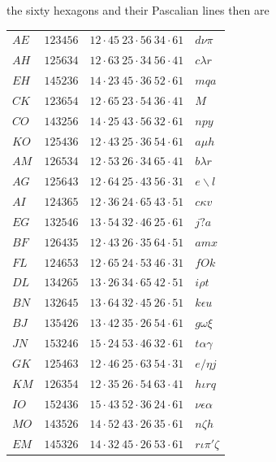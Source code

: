 \documentclass[11pt,a4paper]{article}
\theoremstyle{definition}
\begin{document}
\newpage

the sixty hexagons and their Pascalian lines then are
\begin{center}
\small
\begin{tabular}{llll}
$AE$ & $123456$ & $12 \cdot 45\ 23 \cdot 56\ 34 \cdot 61$ & $d\nu\pi$\\
$AH$ & $125634$ & $12 \cdot 63\ 25 \cdot 34\ 56 \cdot 41$ & $c\lambda r$\\
$EH$ & $145236$ & $14 \cdot 23\ 45 \cdot 36\ 52 \cdot 61$ & $mqa$\\
$CK$ & $123654$ & $12 \cdot 65\ 23 \cdot 54\ 36 \cdot 41$ & $M$\\
$CO$ & $143256$ & $14 \cdot 25\ 43 \cdot 56\ 32 \cdot 61$ & $npy$\\
$KO$ & $125436$ & $12 \cdot 43\ 25 \cdot 36\ 54 \cdot 61$ & $a\mu h$\\
$AM$ & $126534$ & $12 \cdot 53\ 26 \cdot 34\ 65 \cdot 41$ & $b\lambda r$\\
$AG$ & $125643$ & $12 \cdot 64\ 25 \cdot 43\ 56 \cdot 31$ & $e\backslash l$\\
$AI$ & $124365$ & $12 \cdot 36\ 24 \cdot 65\ 43 \cdot 51$ & $c\kappa v$\\
$EG$ & $132546$ & $13 \cdot 54\ 32 \cdot 46\ 25 \cdot 61$ & $j?a$\\
$BF$ & $126435$ & $12 \cdot 43\ 26 \cdot 35\ 64 \cdot 51$ & $amx$\\
$FL$ & $124653$ & $12 \cdot 65\ 24 \cdot 53\ 46 \cdot 31$ & $fOk$\\
$DL$ & $134265$ & $13 \cdot 26\ 34 \cdot 65\ 42 \cdot 51$ & $i\rho t$\\
$BN$ & $132645$ & $13 \cdot 64\ 32 \cdot 45\ 26 \cdot 51$ & $k\epsilon u$\\
$BJ$ & $135426$ & $13 \cdot 42\ 35 \cdot 26\ 54 \cdot 61$ & $g\omega\xi$\\
$JN$ & $153246$ & $15 \cdot 24\ 53 \cdot 46\ 32 \cdot 61$ & $t\alpha\gamma$\\
$GK$ & $125463$ & $12 \cdot 46\ 25 \cdot 63\ 54 \cdot 31$ & $e/\eta j$\\
$KM$ & $126354$ & $12 \cdot 35\ 26 \cdot 54\ 63 \cdot 41$ & $h\iota rq$\\
$IO$ & $152436$ & $15 \cdot 43\ 52 \cdot 36\ 24 \cdot 61$ & $\nu\epsilon\alpha$\\
$MO$ & $143526$ & $14 \cdot 52\ 43 \cdot 26\ 35 \cdot 61$ & $n\zeta h$\\
$EM$ & $145326$ & $14 \cdot 32\ 45 \cdot 26\ 53 \cdot 61$ & $r\iota\pi'\zeta$\\

\end{tabular}
\end{center}
\end{document}
